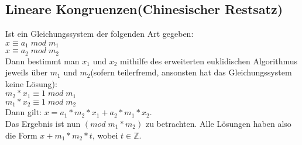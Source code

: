 \documentclass[11pt]{article}
\begin{document}
\subsection{Lineare Kongruenzen(Chinesischer Restsatz)}
Ist ein Gleichungssystem der folgenden Art gegeben:\\
$x \equiv a_1\; mod\; m_1$\\ $x \equiv a_2\; mod\; m_2$\\
Dann bestimmt man $x_1$ und $x_2$ mithilfe des erweiterten euklidischen Algorithmus jeweils {\"u}ber $m_1$ und $m_2$(sofern teilerfremd, ansonsten hat das Gleichungssystem keine L{\"o}sung):\\
$m_2 * x_1 \equiv 1\; mod\; m_1$ \\ $m_1 * x_2 \equiv 1\; mod\; m_2$\\
Dann gilt: $x=a_1*m_2*x_1+a_2*m_1*x_2$.\\
Das Ergebnis ist nun $(mod\;m_1*m_2)$ zu betrachten. Alle L{\"o}sungen haben also die Form $x + m_1*m_2*t$, wobei $t\in \mathbb{Z}$.
\end{document}
